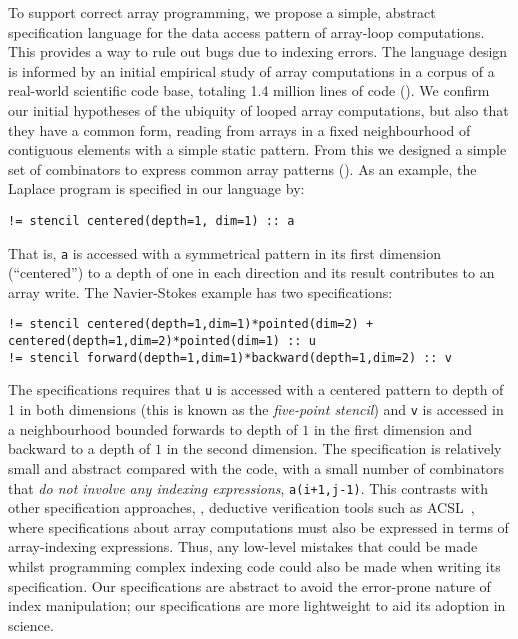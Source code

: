 To support correct array programming, we propose a simple,
abstract specification language for the data access pattern of
array-loop computations. This provides a way to rule out bugs due to
indexing errors. The language design is informed by an initial
empirical study of array computations in a corpus of a real-world
scientific code base, totaling 1.4 million lines of
code (). We confirm our initial hypotheses of the
ubiquity of looped array computations, but also that they have a
common form, reading from arrays in a fixed neighbourhood of
contiguous elements with a simple static pattern. From this we
designed a simple set of combinators to express common array patterns ().
As an example, the Laplace program is specified in our language by:
%
\begin{verbatim}
!= stencil centered(depth=1, dim=1) :: a
\end{verbatim}
%
That is, \texttt{a} is accessed with a symmetrical pattern in its
first dimension (``centered'') to a depth of one in each direction and
its result contributes to an array
write.  The Navier-Stokes example has two specifications:
%
\begin{verbatim}
!= stencil centered(depth=1,dim=1)*pointed(dim=2) + centered(depth=1,dim=2)*pointed(dim=1) :: u
!= stencil forward(depth=1,dim=1)*backward(depth=1,dim=2) :: v
\end{verbatim}
%
\label{exm:checking}
The specifications requires that \texttt{u}
is accessed with a centered pattern to depth of 1 in both dimensions
(this is known as the \emph{five-point stencil}) and \texttt{v} is
accessed in a neighbourhood bounded forwards to depth of $1$ in the
first dimension and backward to a depth of $1$ in the second
dimension. The specification is relatively small and abstract compared
with the code, with a small number of combinators that \emph{do not
  involve any indexing expressions}, \eg{} \texttt{a(i+1,j-1)}. This
contrasts with other specification approaches, \eg{}, deductive
verification tools such as ACSL~\citet{baudin2008acsl}, where
specifications about array computations must also be expressed in
terms of array-indexing expressions. Thus, any low-level mistakes that
could be made whilst programming complex indexing code could also be
made when writing its specification. Our specifications are
abstract to avoid the error-prone nature of index manipulation; our
specifications are more lightweight to aid its adoption in science.

